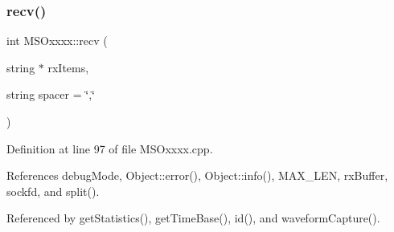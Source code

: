 \subsubsection{\texorpdfstring{recv()}{recv()}}
{\footnotesize\ttfamily int M\+S\+Oxxxx\+::recv (\begin{DoxyParamCaption}\item[{string $\ast$}]{rx\+Items,  }\item[{string}]{spacer = {\ttfamily \char`\"{},\char`\"{}} }\end{DoxyParamCaption})\hspace{0.3cm}{\ttfamily [private]}}



Definition at line 97 of file M\+S\+Oxxxx.\+cpp.



References debug\+Mode, Object\+::error(), Object\+::info(), M\+A\+X\+\_\+\+L\+EN, rx\+Buffer, sockfd, and split().



Referenced by get\+Statistics(), get\+Time\+Base(), id(), and waveform\+Capture().


